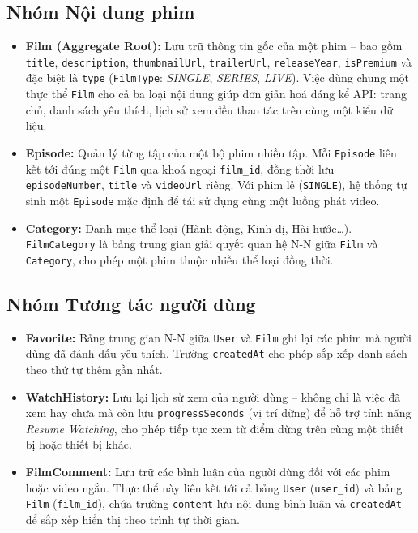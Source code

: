 \subsection{Nhóm Nội dung phim}

\begin{itemize}
  \item \textbf{Film (Aggregate Root):} Lưu trữ thông tin gốc của một phim -- bao
  gồm \texttt{title}, \texttt{description}, \texttt{thumbnailUrl},
  \texttt{trailerUrl}, \texttt{releaseYear}, \texttt{isPremium} và đặc biệt là
  \texttt{type} (\texttt{FilmType}: \textit{SINGLE}, \textit{SERIES}, \textit{LIVE}).
  Việc dùng chung một thực thể \texttt{Film} cho cả ba loại nội dung giúp đơn giản
  hoá đáng kể API: trang chủ, danh sách yêu thích, lịch sử xem đều thao tác trên
  cùng một kiểu dữ liệu.

  \item \textbf{Episode:} Quản lý từng tập của một bộ phim nhiều tập. Mỗi
  \texttt{Episode} liên kết tới đúng một \texttt{Film} qua khoá ngoại
  \texttt{film\_id}, đồng thời lưu \texttt{episodeNumber}, \texttt{title} và
  \texttt{videoUrl} riêng. Với phim lẻ (\texttt{SINGLE}), hệ thống tự sinh một
  \texttt{Episode} mặc định để tái sử dụng cùng một luồng phát video.

  \item \textbf{Category:} Danh mục thể loại (Hành động, Kinh dị, Hài hước\dots).
  \texttt{FilmCategory} là bảng trung gian giải quyết quan hệ N-N giữa
  \texttt{Film} và \texttt{Category}, cho phép một phim thuộc nhiều thể loại đồng
  thời.
\end{itemize}

\subsection{Nhóm Tương tác người dùng}

\begin{itemize}
  \item \textbf{Favorite:} Bảng trung gian N-N giữa \texttt{User} và \texttt{Film}
  ghi lại các phim mà người dùng đã đánh dấu yêu thích. Trường \texttt{createdAt}
  cho phép sắp xếp danh sách theo thứ tự thêm gần nhất.

  \item \textbf{WatchHistory:} Lưu lại lịch sử xem của người dùng -- không chỉ là
  việc đã xem hay chưa mà còn lưu \texttt{progressSeconds} (vị trí dừng) để hỗ
  trợ tính năng \textit{Resume Watching}, cho phép tiếp tục xem từ điểm dừng trên
  cùng một thiết bị hoặc thiết bị khác.

  \item \textbf{FilmComment:} Lưu trữ các bình luận của người dùng đối với các phim hoặc
  video ngắn. Thực thể này liên kết tới cả bảng \texttt{User} (\texttt{user\_id}) và
  bảng \texttt{Film} (\texttt{film\_id}), chứa trường \texttt{content} lưu nội dung bình
  luận và \texttt{createdAt} để sắp xếp hiển thị theo trình tự thời gian.
\end{itemize}

